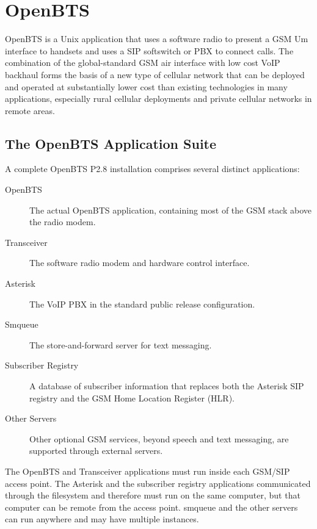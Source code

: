 \chapter{OpenBTS}

OpenBTS is a Unix application that uses a software radio to present a GSM Um interface 
to handsets and uses a SIP softswitch or PBX to connect calls.
The combination of the global-standard GSM air interface with low cost VoIP backhaul forms the basis of a new type of cellular network that can be deployed and operated at substantially lower cost than existing technologies in many applications, especially rural cellular deployments and private cellular networks in remote areas.

\section{The OpenBTS Application Suite}
A complete OpenBTS P2.8 installation comprises several distinct applications:

\begin{description}
\item[OpenBTS] The actual OpenBTS application, containing most of the GSM stack above the radio modem.
\item[Transceiver] The software radio modem and hardware control interface.
\item[Asterisk] The VoIP PBX in the standard public release configuration.
\item[Smqueue] The store-and-forward server for text messaging.
\item[Subscriber Registry] A database of subscriber information that replaces both the Asterisk SIP registry and the GSM Home Location Register (HLR).
\item[Other Servers] Other optional GSM services, beyond speech and text messaging, are supported through external servers.
\end{description}

The OpenBTS and Transceiver applications must run inside each GSM/SIP access point. The Asterisk and the subscriber registry applications communicated through the filesystem and therefore must run on the same computer, but that computer can be remote from the access point. smqueue and the other servers can run anywhere and may have multiple instances.

